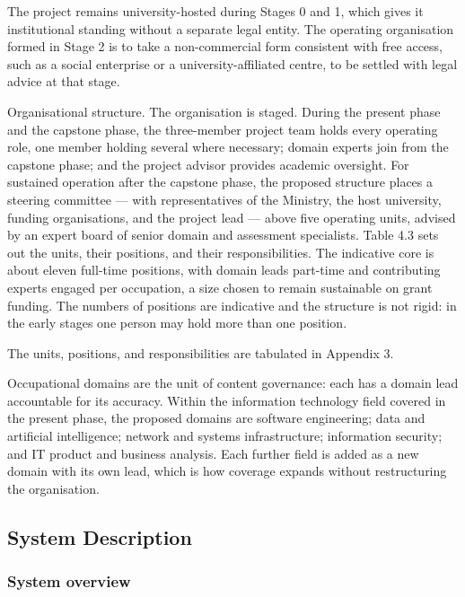 The project remains university-\allowbreak{}hosted during Stages 0 and 1, which gives it institutional standing without a separate legal entity. The operating organisation formed in Stage 2 is to take a non-\allowbreak{}commercial form consistent with free access, such as a social enterprise or a university-\allowbreak{}affiliated centre, to be settled with legal advice at that stage.

Organisational structure. The organisation is staged. During the present phase and the capstone phase, the three-\allowbreak{}member project team holds every operating role, one member holding several where necessary; domain experts join from the capstone phase; and the project advisor provides academic oversight. For sustained operation after the capstone phase, the proposed structure places a steering committee --- with representatives of the Ministry, the host university, funding organisations, and the project lead --- above five operating units, advised by an expert board of senior domain and assessment specialists. Table 4.3 sets out the units, their positions, and their responsibilities. The indicative core is about eleven full-time positions, with domain leads part-time and contributing experts engaged per occupation, a size chosen to remain sustainable on grant funding. The numbers of positions are indicative and the structure is not rigid: in the early stages one person may hold more than one position.

The units, positions, and responsibilities are tabulated in Appendix 3.

Occupational domains are the unit of content governance: each has a domain lead accountable for its accuracy. Within the information technology field covered in the present phase, the proposed domains are software engineering; data and artificial intelligence; network and systems infrastructure; information security; and IT product and business analysis. Each further field is added as a new domain with its own lead, which is how coverage expands without restructuring the organisation.

\subsection{System Description}

\subsubsection{System overview}

